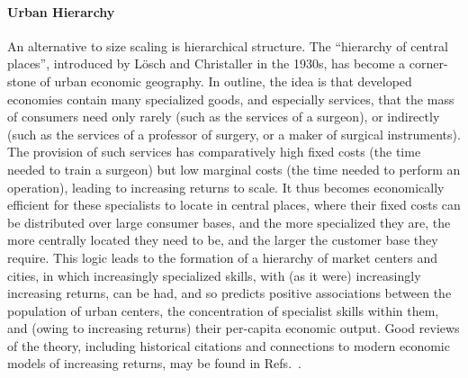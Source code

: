 \documentclass{pnastwo}
\begin{document}
\begin{article}
\paragraph{Urban Hierarchy} 
An alternative to size scaling is hierarchical structure.  The ``hierarchy of
central places'', introduced by L{\"o}sch and Christaller in the 1930s, has
become a corner-stone of urban economic geography.  In outline, the idea is
that developed economies contain many specialized goods, and especially
services, that the mass of consumers need only rarely (such as the services of
a surgeon), or indirectly (such as the services of a professor of surgery, or a
maker of surgical instruments).  The provision of such services has
comparatively high fixed costs (the time needed to train a surgeon) but low
marginal costs (the time needed to perform an operation), leading to increasing
returns to scale.  It thus becomes economically efficient for these specialists
to locate in central places, where their fixed costs can be distributed over
large consumer bases, and the more specialized they are, the more centrally
located they need to be, and the larger the customer base they require.  This
logic leads to the formation of a hierarchy of market centers and cities, in
which increasingly specialized skills, with (as it were) increasingly
increasing returns, can be had, and so predicts positive associations between
the population of urban centers, the concentration of specialist skills within
them, and (owing to increasing returns) their per-capita economic output.  Good
reviews of the theory, including historical citations and connections to modern
economic models of increasing returns, may be found in Refs.\
\cite{Krugman-self-organizing,Fujita-Krugman-Venables}.


\end{article}
\end{document}
